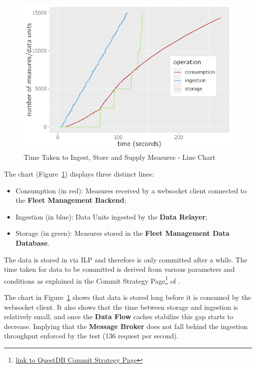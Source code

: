 \begin{figure}[H]
    \centering
    \includegraphics[page=1,width=0.7\columnwidth]{assets/charts/s4.pdf}
    \caption[Time Taken to Ingest, Store and Supply Measures - Line Chart]{Time Taken to Ingest, Store and Supply Measures - Line Chart}
    \label{fig:evaluation:overview:servicedatabase:chart:s4}
\end{figure}

The chart (Figure~\ref{fig:evaluation:overview:servicedatabase:chart:s4}) displays three distinct lines:

\begin{itemize}
    \item Consumption (in red): Measures received by a websocket client connected to the \textbf{Fleet Management Backend};
    \item Ingestion (in blue): Data Units ingested by the \textbf{Data Relayer};
    \item Storage (in green): Measures stored in the \textbf{Fleet Management Data Database}.
\end{itemize}

The data is stored in  via \gls{ILP} and therefore is only committed after a while. The time taken for data to be committed is derived from various parameters and conditions as explained in the Commit Strategy Page\footnote{\href {https://questdb.io/docs/reference/api/ilp/tcp-receiver/\#commit-strategy}{link to QuestDB Commit Strategy Page}} of .

The chart in Figure~\ref{fig:evaluation:overview:servicedatabase:chart:s4} shows that data is stored long before it is consumed by the websocket client. It also shows that the time between storage and ingestion is relatively small, and once the \textbf{Data Flow} caches stabilize this gap starts to decrease. Implying that the \textbf{Message Broker} does not fall behind the ingestion throughput enforced by the test (136 request per second).


